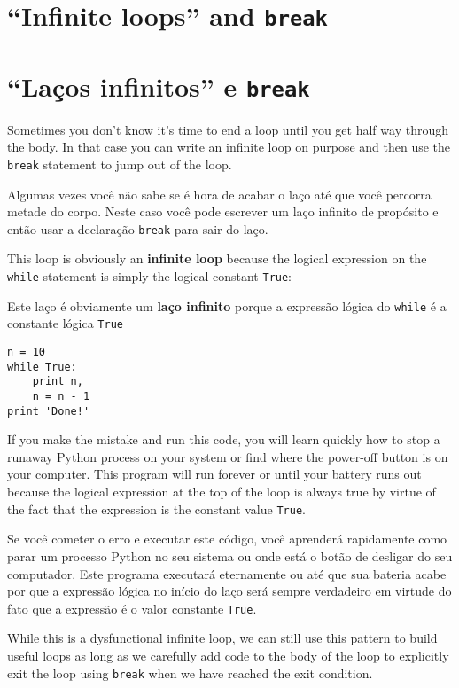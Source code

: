 \section{``Infinite loops'' and {\tt break}}

\section{``Laços infinitos'' e {\tt break}}

Sometimes you don't know it's time to end a loop until you get half
way through the body.  In that case you can write an infinite loop on purpose
and then use the {\tt break} statement to jump out of the loop.

Algumas vezes você não sabe se é hora de acabar o laço até que você percorra
metade do corpo. Neste caso você pode escrever um laço infinito de propósito
e então usar a declaração {\tt break} para sair do laço.

This loop is obviously an {\bf infinite loop} because the logical 
expression on the
{\tt while} statement is simply the logical constant {\tt True}:

Este laço é obviamente um {\bf laço infinito} porque a expressão lógica do
{\tt while} é a constante lógica {\tt True}

\beforeverb
\begin{verbatim}
n = 10
while True:
    print n, 
    n = n - 1
print 'Done!'
\end{verbatim}
\afterverb
%
If you make the mistake and run this code, you will learn quickly how
to stop a runaway Python process on your system or find where the power-off
button is on your computer.  
This program will 
run forever or until your battery runs out 
because the logical expression at the top of the loop 
is always true by virtue of the fact that the expression is the 
constant value {\tt True}.

%
Se você cometer o erro e executar este código, você aprenderá rapidamente como
parar um processo Python no seu sistema ou onde está o botão de desligar do
seu computador. Este programa executará eternamente ou até que sua bateria
acabe por que a expressão lógica no início do laço será sempre verdadeiro
em virtude do fato que a expressão é o valor constante {\tt True}.

While this is a dysfunctional infinite loop, we can still use this pattern
to build useful loops as long as we carefully add code to the 
body of the loop to explicitly exit the loop using {\tt break} 
when we have reached 
the exit condition.


